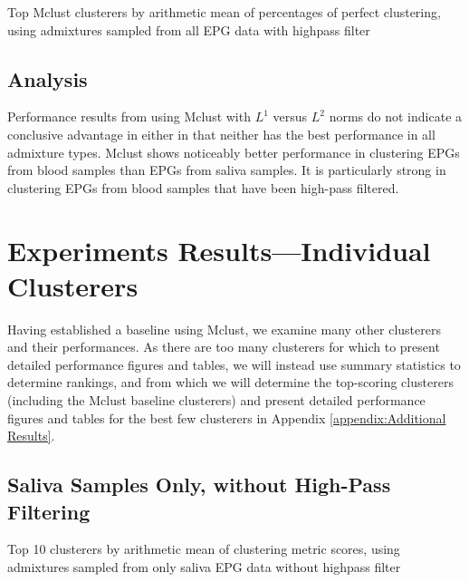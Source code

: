 \begin{table}[H]
\centering
{}
\caption{Top Mclust clusterers by arithmetic mean of percentages of perfect clustering, using admixtures sampled from all EPG data with highpass filter}
\label{table:top_mclust_clusterers_by_binomial_confidence_highpass_71-sampleids_all-nruns_1000}
\end{table}

\subsection{Analysis}

Performance results from using Mclust with $L^{1}$ versus $L^{2}$ norms do not indicate a conclusive advantage in either in that neither has the best performance in all admixture types. Mclust shows noticeably better performance in clustering EPGs from blood samples than EPGs from saliva samples. It is particularly strong in clustering EPGs from blood samples that have been high-pass filtered.

\section{Experiments Results---Individual Clusterers}

Having established a baseline using Mclust, we examine many other clusterers and their performances. As there are too many clusterers for which to present detailed performance figures and tables, we will instead use summary statistics to determine rankings, and from which we will determine the top-scoring clusterers (including the Mclust baseline clusterers) and present detailed performance figures and tables for the best few clusterers in Appendix \ref{appendix:Additional Results}.

\subsection{Saliva Samples Only, without High-Pass Filtering}

\begin{table}[H]
\centering
{}
\caption{Top 10 clusterers by arithmetic mean of clustering metric scores, using admixtures sampled from only saliva EPG data without highpass filter}
\label{table:top_10_not_ensemble_clusterers_by_metrics_highpass_0-sampleids_saliva-nruns_1000}
\end{table}

